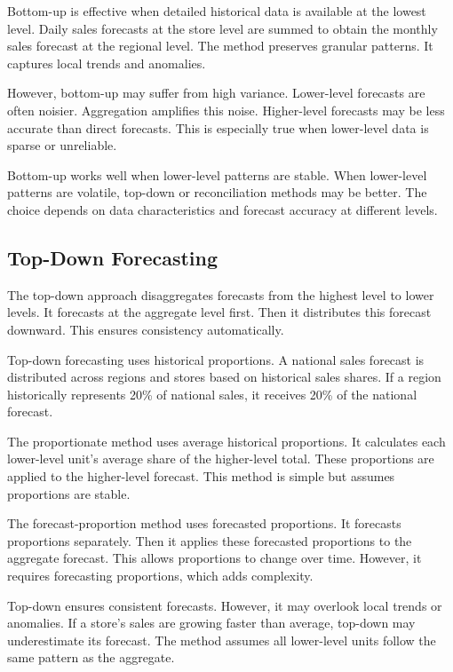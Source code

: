 Bottom-up is effective when detailed historical data is available at the lowest level. Daily sales forecasts at the store level are summed to obtain the monthly sales forecast at the regional level. The method preserves granular patterns. It captures local trends and anomalies.

However, bottom-up may suffer from high variance. Lower-level forecasts are often noisier. Aggregation amplifies this noise. Higher-level forecasts may be less accurate than direct forecasts. This is especially true when lower-level data is sparse or unreliable.

Bottom-up works well when lower-level patterns are stable. When lower-level patterns are volatile, top-down or reconciliation methods may be better. The choice depends on data characteristics and forecast accuracy at different levels.

\subsection{Top-Down Forecasting}

The top-down approach disaggregates forecasts from the highest level to lower levels. It forecasts at the aggregate level first. Then it distributes this forecast downward. This ensures consistency automatically.

Top-down forecasting uses historical proportions. A national sales forecast is distributed across regions and stores based on historical sales shares. If a region historically represents 20\% of national sales, it receives 20\% of the national forecast.

The proportionate method uses average historical proportions. It calculates each lower-level unit's average share of the higher-level total. These proportions are applied to the higher-level forecast. This method is simple but assumes proportions are stable.

The forecast-proportion method uses forecasted proportions. It forecasts proportions separately. Then it applies these forecasted proportions to the aggregate forecast. This allows proportions to change over time. However, it requires forecasting proportions, which adds complexity.

Top-down ensures consistent forecasts. However, it may overlook local trends or anomalies. If a store's sales are growing faster than average, top-down may underestimate its forecast. The method assumes all lower-level units follow the same pattern as the aggregate.

